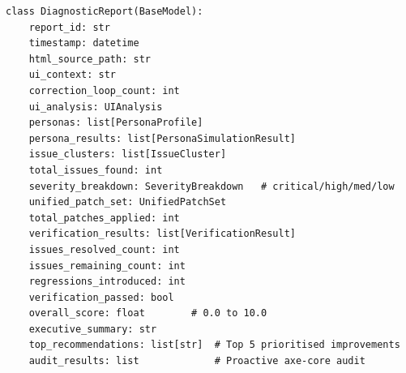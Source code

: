 \begin{lstlisting}[caption={DiagnosticReport Pydantic model (from \filepath{schemas/report\_schema.py}).}, label={lst:diagnosticreport}]
class DiagnosticReport(BaseModel):
    report_id: str
    timestamp: datetime
    html_source_path: str
    ui_context: str
    correction_loop_count: int
    ui_analysis: UIAnalysis
    personas: list[PersonaProfile]
    persona_results: list[PersonaSimulationResult]
    issue_clusters: list[IssueCluster]
    total_issues_found: int
    severity_breakdown: SeverityBreakdown   # critical/high/med/low
    unified_patch_set: UnifiedPatchSet
    total_patches_applied: int
    verification_results: list[VerificationResult]
    issues_resolved_count: int
    issues_remaining_count: int
    regressions_introduced: int
    verification_passed: bool
    overall_score: float        # 0.0 to 10.0
    executive_summary: str
    top_recommendations: list[str]  # Top 5 prioritised improvements
    audit_results: list             # Proactive axe-core audit
\end{lstlisting}
